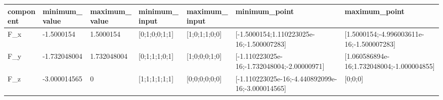 \begin{tabular}{@{}lllllll@{}}
\toprule
component & minimum\_value & maximum\_value & minimum\_input & maximum\_input & minimum\_point & maximum\_point \\
\midrule
F\_x & -1.5000154 & 1.5000154 & [0;1;0;0;1;1] & [1;0;1;1;0;0] & [-1.5000154;1.110223025e-16;-1.500007283] & [1.5000154;-4.996003611e-16;-1.500007283] \\
F\_y & -1.732048004 & 1.732048004 & [0;1;1;1;0;1] & [1;0;0;0;1;0] & [-1.110223025e-16;-1.732048004;-2.00000971] & [1.060586894e-16;1.732048004;-1.000004855] \\
F\_z & -3.000014565 & 0 & [1;1;1;1;1;1] & [0;0;0;0;0;0] & [-1.110223025e-16;-4.440892099e-16;-3.000014565] & [0;0;0] \\
\bottomrule
\end{tabular}
